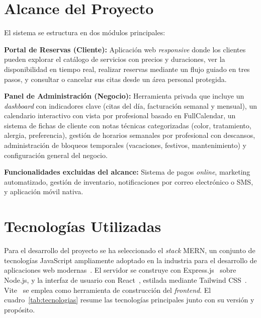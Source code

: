 \section{Alcance del Proyecto}\label{sec:alcance}

El sistema se estructura en dos m\'odulos principales:

\textbf{Portal de Reservas (Cliente):} Aplicaci\'on web \textit{responsive} donde los clientes pueden explorar el cat\'alogo de servicios con precios y duraciones, ver la disponibilidad en tiempo real, realizar reservas mediante un flujo guiado en tres pasos, y consultar o cancelar sus citas desde un \'area personal protegida.

\textbf{Panel de Administraci\'on (Negocio):} Herramienta privada que incluye un \textit{dashboard} con indicadores clave (citas del d\'ia, facturaci\'on semanal y mensual), un calendario interactivo con vista por profesional basado en FullCalendar, un sistema de fichas de cliente con notas t\'ecnicas categorizadas (color, tratamiento, alergia, preferencia), gesti\'on de horarios semanales por profesional con descansos, administraci\'on de bloqueos temporales (vacaciones, festivos, mantenimiento) y configuraci\'on general del negocio.

\textbf{Funcionalidades excluidas del alcance:} Sistema de pagos \textit{online}, marketing automatizado, gesti\'on de inventario, notificaciones por correo electr\'onico o SMS, y aplicaci\'on m\'ovil nativa.

\section{Tecnolog\'ias Utilizadas}\label{sec:tecnologias}

Para el desarrollo del proyecto se ha seleccionado el \textit{stack} MERN, un conjunto de tecnolog\'ias JavaScript ampliamente adoptado en la industria para el desarrollo de aplicaciones web modernas~\cite{mern_stack}. El servidor se construye con Express.js~\cite{express_docs} sobre Node.js, y la interfaz de usuario con React~\cite{react_docs}, estilada mediante Tailwind CSS~\cite{tailwind_docs}. Vite~\cite{vite_docs} se emplea como herramienta de construcci\'on del \textit{frontend}. El cuadro~\ref{tab:tecnologias} resume las tecnolog\'ias principales junto con su versi\'on y prop\'osito.

